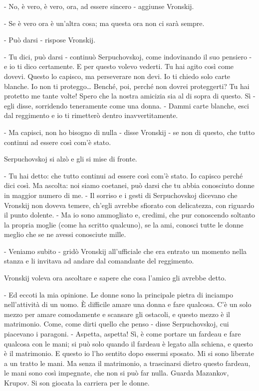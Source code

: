- No, è vero, è vero, ora, ad essere sincero - aggiunse Vronskij. 

- Se è vero ora è un'altra cosa; ma questa ora non ci sarà sempre. 

- Può darsi - rispose Vronskij. 

- Tu dici, può darsi - continuò Serpuchovskoj, come indovinando il suo pensiero - e io ti dico certamente. E per questo volevo vederti. Tu hai agito così come dovevi. Questo lo capisco, ma perseverare non devi. Io ti chiedo solo carte blanche. Io non ti proteggo\ldots{} Benché, poi, perché non dovrei proteggerti? Tu hai protetto me tante volte! Spero che la nostra amicizia sia al di sopra di questo. Sì - egli disse, sorridendo teneramente come una donna. - Dammi carte blanche, esci dal reggimento e io ti rimetterò dentro inavvertitamente. 

- Ma capisci, non ho bisogno di nulla - disse Vronskij - se non di questo, che tutto continui ad essere così com'è stato. 

Serpuchovskoj si alzò e gli si mise di fronte. 

- Tu hai detto: che tutto continui ad essere così com'è stato. Io capisco perché dici così. Ma ascolta: noi siamo coetanei, può darsi che tu abbia conosciuto donne in maggior numero di me. - Il sorriso e i gesti di Serpuchovskoj dicevano che Vronskij non doveva temere, ch'egli avrebbe sfiorato con delicatezza, con riguardo il punto dolente. - Ma io sono ammogliato e, credimi, che pur conoscendo soltanto la propria moglie (come ha scritto qualcuno), se la ami, conosci tutte le donne meglio che se ne avessi conosciute mille. 

- Veniamo subito - gridò Vronskij all'ufficiale che era entrato un momento nella stanza e li invitava ad andare dal comandante del reggimento. 

Vronskij voleva ora ascoltare e sapere che cosa l'amico gli avrebbe detto. 

- Ed eccoti la mia opinione. Le donne sono la principale pietra di inciampo nell'attività di un uomo. È difficile amare una donna e fare qualcosa. C'è un solo mezzo per amare comodamente e scansare gli ostacoli, e questo mezzo è il matrimonio. Come, come dirti quello che penso - disse Serpuchovskoj, cui piacevano i paragoni. - Aspetta, aspetta! Sì, è come portare un fardeau e fare qualcosa con le mani; si può solo quando il fardeau è legato alla schiena, e questo è il matrimonio. E questo io l'ho sentito dopo essermi sposato. Mi si sono liberate a un tratto le mani. Ma senza il matrimonio, a trascinarsi dietro questo fardeau, le mani sono così impegnate, che non si può far nulla. Guarda Mazankov, Krupov. Si son giocata la carriera per le donne. 

